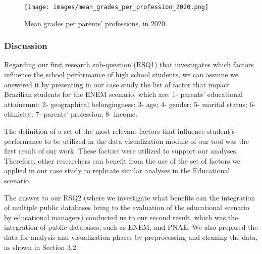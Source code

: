 \documentclass[12pt]{article}
\begin{document}
\begin{figure}[h!]
\centerline{\texttt{[image: images/mean\_grades\_per\_profession\_2020.png]}}
\caption{Mean grades per parents' professions, in 2020.} 
\label{profession}
\end{figure}


\subsubsection{Discussion}

Regarding our first research sub-question (RSQ1) that investigates which factors influence the school performance of high school
students, we can assume we answered it by presenting in our case study the list of factor that impact Brazilian students for the ENEM scenario, which are: 1- parents' educational attainemnt; 2- geographical belongingness; 3- age; 4- gender; 5- marital status; 6- ethnicity; 7- parents' profession; 8- income.

The definition of a set of the most relevant factors that influence student’s performance to be utilized in the data visualization module of our tool was the first result of our work. These factors were utilized to support our analyses.
Therefore, other researchers can benefit from the use of the set of factors we applied in our case study to replicate similar analyses in the Educational scenario. 


The answer to our RSQ2 (where we investigate what benefits can the integration of multiple public databases bring to the evaluation of the educational scenario by educational managers) conducted us to our second result, which was the integration of public databases, such as ENEM, and PNAE. We also prepared the data for analysis and visualization phases by preprocessing and cleaning the data, as shown in Section 3.2. 
\end{document}
